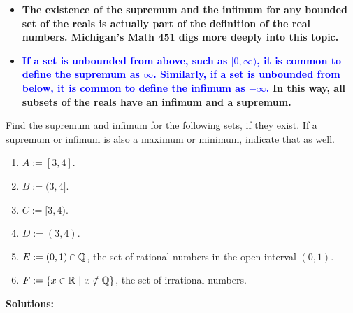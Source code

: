 \begin{tcolorbox}[colback=mylightblue, title = {\bf Sup and Inf Values of a Set}, breakable]
\begin{rem}
\begin{itemize}
   \item {\bf The existence of the supremum and the infimum for any bounded set of the reals is actually part of the definition of the real numbers. Michigan's Math 451 digs more deeply into this topic.}

   \item \textcolor{blue}{\bf If a set is unbounded from above, such as $[0, \infty)$, it is common to define the supremum as $\infty$. Similarly, if a set is unbounded from below,  it is common to define the infimum as $-\infty$.} {\bf In this way, all subsets of the reals have an infimum and a supremum.}

\end{itemize}
    
\end{rem}

\end{tcolorbox}

\bigskip

\begin{example} Find the supremum and infimum for the following sets, if they exist. If a supremum or infimum is also a maximum or minimum, indicate that as well.

\begin{enumerate}
\renewcommand{\labelenumi}{(\alph{enumi})}
\setlength{\itemsep}{.2cm}
    \item  $A:=[3, 4]$.

    \item  $B:=(3, 4]$.

    \item  $C:=[3, 4)$.

    \item $D:=(3, 4)$.

    \item $E:= (0, 1) \cap \mathbb Q$, the set of rational numbers in the open interval $(0, 1)$.
    
    \item $F:= \{ x\in  \mathbb R ~ | ~ x \notin \mathbb Q \}$, the set of irrational numbers.
    
\end{enumerate}
    
\end{example}

\textbf{Solutions:}

